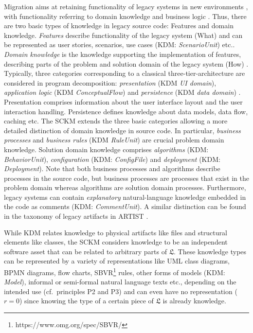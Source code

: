 Migration aims at retaining functionality of legacy systems in new environments \autocite{Bisbal1999LegacyInformationSystems}, with functionality referring to domain knowledge and business logic \autocite{Wagner2014}.
Thus, there are two basic types of knowledge in legacy source code: Features and domain knowledge.
\emph{Features} describe functionality of the legacy system (What) \autocite{SWEBOK2014,Rubin2013FeatureLocation,Rajlich2002Concepts} and can be represented as user stories, scenarios, use cases (KDM: \emph{ScenarioUnit}) etc..
\emph{Domain knowledge} is the knowledge supporting the implementation of features, describing parts of the problem and solution domain of the legacy system (How) \autocite{Marcus2004ProblemLocation,Rajlich2002Concepts}.
Typically, three categories corresponding to a classical three-tier-architecture are considered in program decomposition: \emph{presentation} (KDM \emph{UI domain}), \emph{application logic} (KDM \emph{ConceptualFlow}) and \emph{persistence} (KDM \emph{data domain}) \autocite{Canfora2000Decomposing}.
Presentation comprises information about the user interface layout and the user interaction handling.
Persistence defines knowledge about data models, data flow, caching etc.
The SCKM extends the three basic categories allowing a more detailed distinction of domain knowledge in source code.
In particular, \emph{business processes} and \emph{business rules} (KDM \emph{RuleUnit}) \autocite{Aversano2001,Sneed2010SoftwareMigration,Wagner2014Fundamentals,Ulrich2011} are crucial problem domain knowledge.
Solution domain knowledge comprises \emph{algorithms} (KDM: \emph{BehaviorUnit}), \emph{configuration} (KDM: \emph{ConfigFile}) and \emph{deployment} (KDM: \emph{Deployment}).
Note that both business processes and algorithms describe processes in the source code, but business processes are processes that exist in the problem domain whereas algorithms are solution domain processes.
Furthermore, legacy systems can contain \emph{explanatory} natural-language knowledge embedded in the code as comments (KDM: \emph{CommentUnit}).
A similar distinction can be found in the taxonomy of legacy artifacts in ARTIST
\autocite{ARTIST2013Taxonomy}.

While KDM relates knowledge to physical artifacts like files and structural elements like classes, the SCKM considers knowledge to be an independent software asset that can be related to arbitrary parts of \(\mathfrak{L}\).
These knowledge types can be represented by a variety of representations like UML class diagrams, BPMN diagrams, flow charts, SBVR\footnote{https://www.omg.org/spec/SBVR/} rules, other forms of models (KDM: \emph{Model}), informal or semi-formal natural language texts etc., depending on the intended use (cf.~principles P2 and P3) and can even have no representation (\(r=0\)) since knowing the type of a certain piece of \(\mathfrak{L}\) is already knowledge.

